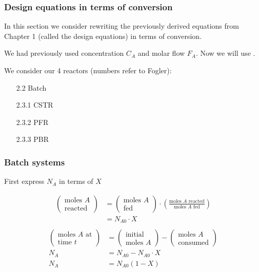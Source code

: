 \begin{frame}\frametitle{Design equations in terms of conversion}
	In this section we consider rewriting the previously derived equations from Chapter 1 (called the design equations) in terms of conversion.
	
	We had previously used concentration $C_A$ and molar flow $F_A$. Now we will use {\color{purple}{$X$, conversion}}.
	
	\vspace{12pt}
	We consider our 4 reactors {\small (numbers refer to Fogler)}:
	\vspace{6pt}
	\begin{enumerate}
		\item[2.2]	Batch
		\item[2.3.1]	CSTR
		\item[2.3.2]	PFR
		\item[2.3.3]	PBR
	\end{enumerate}
\end{frame}

\begin{frame}\frametitle{Batch systems}
	\vspace{12pt}
	First express $N_A$ in terms of $X$
	
	\begin{align*}
		\left(\begin{array}{c}
			\text{moles } A \\
			\text{reacted}
		\end{array}\right)
		&=
		\left(\begin{array}{c}
			\text{moles }A\\
			\text{fed}
		\end{array}\right)
		\cdot
		\left(\frac{\text{moles }A\text{ reacted}}{\text{moles }A\text{ fed}}\right)\\
		&= N_{A0} \cdot X\\
	\end{align*}
	\begin{align*}
		\left(\begin{array}{c}
			\text{moles }A\text{ at}\\
			\text{time }t
		\end{array}\right)
		&=
		\left(\begin{array}{c}
			\text{initial}\\
			\text{moles }A
		\end{array}\right)
		-
		\left(\begin{array}{c}
			\text{moles }A\\
			\text{consumed}
		\end{array}\right)
		\\
		N_A &= N_{A0} - N_{A0}\cdot X \\
		N_A &= N_{A0}(1 - X)
	\end{align*}
\end{frame}

